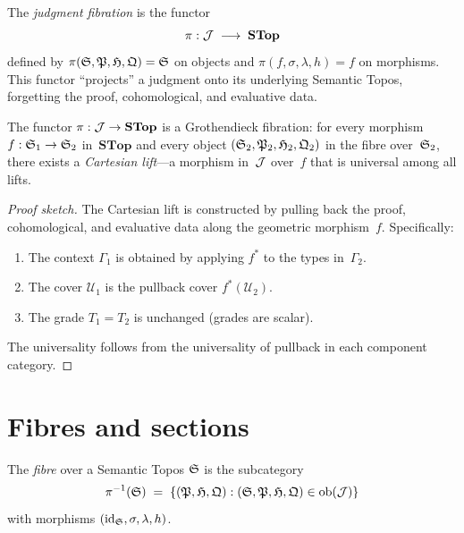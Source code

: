 \begin{definition}
\label{def:judgment-fibration}
The \emph{judgment fibration} is the functor
\[
  \pi : \mathcal{J} \;\longrightarrow\; \mathbf{STop}
\]
defined by $\pi(\mathfrak{S}, \mathfrak{P}, \mathfrak{H}, \mathfrak{Q}) = \mathfrak{S}$ on objects and
$\pi(f, \sigma, \lambda, h) = f$ on morphisms.  This functor
``projects'' a judgment onto its underlying Semantic Topos, forgetting
the proof, cohomological, and evaluative data.
\end{definition}

\begin{theorem}
\label{thm:fibration}
The functor $\pi : \mathcal{J} \to \mathbf{STop}$ is a Grothendieck fibration:
for every morphism $f : \mathfrak{S}_1 \to \mathfrak{S}_2$ in~$\mathbf{STop}$ and
every object $(\mathfrak{S}_2, \mathfrak{P}_2, \mathfrak{H}_2, \mathfrak{Q}_2)$ in the fibre
over~$\mathfrak{S}_2$, there exists a \emph{Cartesian lift}---a morphism
in~$\mathcal{J}$ over~$f$ that is universal among all lifts.
\end{theorem}

\begin{proof}[Proof sketch]
The Cartesian lift is constructed by pulling back the proof, cohomological,
and evaluative data along the geometric morphism~$f$.
Specifically:
\begin{enumerate}[label=(\roman*),nosep]
\item The context $\Gamma_1$ is obtained by applying $f^*$ to the
  types in~$\Gamma_2$.
\item The cover $\mathcal{U}_1$ is the pullback cover
  $f^*(\mathcal{U}_2)$.
\item The grade $T_1 = T_2$ is unchanged (grades are scalar).
\end{enumerate}
The universality follows from the universality of pullback in each
component category.
\end{proof}

\section{Fibres and sections}
\label{sec:fibres-sections}

\begin{definition}[Fibre]
The \emph{fibre} over a Semantic Topos $\mathfrak{S}$ is the subcategory
\[
  \pi^{-1}(\mathfrak{S})
  \;=\;
  \{(\mathfrak{P}, \mathfrak{H}, \mathfrak{Q}) :
  (\mathfrak{S}, \mathfrak{P}, \mathfrak{H}, \mathfrak{Q}) \in \mathrm{ob}(\mathcal{J})\}
\]
with morphisms $(\mathrm{id}_{\mathfrak{S}}, \sigma, \lambda, h)$.
\end{definition}

